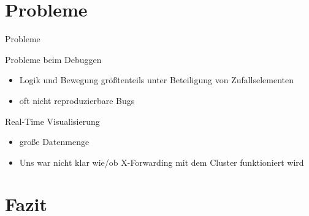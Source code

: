 \section{Probleme}

\begin{frame}{Probleme}
	\begin{block}{Probleme beim Debuggen}
		\begin{itemize}
			\item Logik und Bewegung größtenteils unter Beteiligung von Zufallselementen
			\item oft nicht reproduzierbare Bugs 
		\end{itemize}
	\end{block}
	
	\begin{block} {Real-Time Visualisierung}
		\begin{itemize}
			\item große Datenmenge
			\item Uns war nicht klar wie/ob X-Forwarding mit dem Cluster funktioniert wird
		\end{itemize}
	\end{block}
\end{frame}

\section{Fazit}

	
